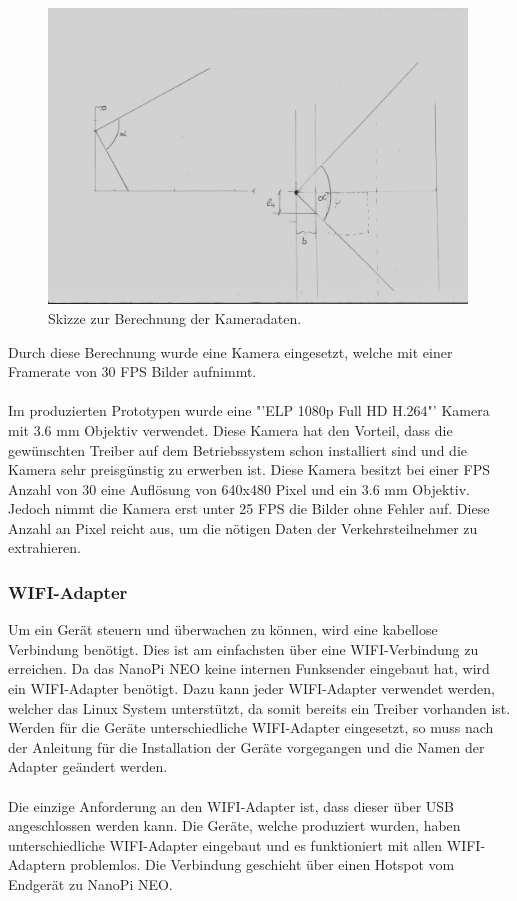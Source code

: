 \begin{figure}[H]
  \centering
  \includegraphics[width=0.99\textwidth]{Hardware/ObjektivBerechnung.jpg} 
  \caption{Skizze zur Berechnung der Kameradaten.}
  \label{bBerechnung}
\end{figure}

Durch diese Berechnung wurde eine Kamera eingesetzt, welche mit einer Framerate von 30 FPS Bilder aufnimmt. \\\\
Im produzierten Prototypen wurde eine "'ELP 1080p Full HD H.264"' Kamera mit 3.6 mm Objektiv verwendet. Diese Kamera hat den Vorteil, dass die gewünschten Treiber auf dem Betriebssystem schon installiert sind und die Kamera sehr preisgünstig zu erwerben ist. Diese Kamera besitzt bei einer FPS Anzahl von 30 eine Auflösung von 640x480 Pixel und ein 3.6 mm Objektiv. Jedoch nimmt die Kamera erst unter 25 FPS die Bilder ohne Fehler auf. Diese Anzahl an Pixel reicht aus, um die nötigen Daten der Verkehrsteilnehmer zu extrahieren. \cite{Kamera}

\subsubsection{WIFI-Adapter}
Um ein Gerät steuern und überwachen zu können, wird eine kabellose Verbindung benötigt. Dies ist am einfachsten über eine WIFI-Verbindung zu erreichen. Da das NanoPi NEO keine internen Funksender eingebaut hat, wird ein WIFI-Adapter benötigt. Dazu kann jeder WIFI-Adapter verwendet werden, welcher das Linux System unterstützt, da somit bereits ein Treiber vorhanden ist. Werden für die Geräte unterschiedliche WIFI-Adapter eingesetzt, so muss nach der Anleitung für die Installation der Geräte vorgegangen und die Namen der Adapter geändert werden.\\\\
Die einzige Anforderung an den WIFI-Adapter ist, dass dieser über USB angeschlossen werden kann. Die Geräte, welche produziert wurden, haben unterschiedliche WIFI-Adapter eingebaut und es funktioniert mit allen WIFI-Adaptern problemlos. Die Verbindung geschieht über einen Hotspot vom Endgerät zu NanoPi NEO.

